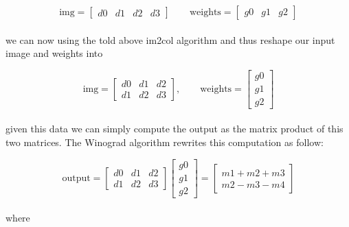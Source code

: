 \documentclass{standalone}
\begin{document}
$$
\mbox{img} = \left[\begin{array}{cccc} d0 & d1 & d2 & d3 \end{array}\right] \quad\quad \mbox{weights} = \left[\begin{array}{ccc} g0 & g1 & g2 \end{array}\right]
$$
\\
we can now using the told above \textsf{im2col} algorithm and thus reshape our input image and weights into

$$
\mbox{img} = \left[
\begin{array}{ccc}
d0 & d1 & d2 \\
d1 & d2 & d3
\end{array}
\right],
\quad\quad
\mbox{weights} = \left[
\begin{array}{c}
g0 \\
g1 \\
g2
\end{array}
\right]
$$
\\
given this data we can simply compute the output as the matrix product of this two matrices.
The Winograd algorithm rewrites this computation as follow:

$$
\mbox{output} = \left[
\begin{array}{ccc}
d0 & d1 & d2 \\
d1 & d2 & d3
\end{array}
\right]
\left[
\begin{array}{c}
g0 \\
g1 \\
g2
\end{array}
\right] = \left[
\begin{array}{c}
m1 + m2 + m3 \\
m2 - m3 - m4
\end{array}
\right]
$$
\\
where
\end{document}
